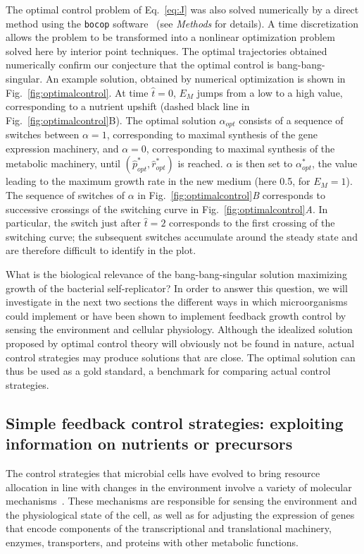 The optimal control problem of Eq.~\ref{eq:J} was also solved numerically by a direct method using the \texttt{bocop} software~\cite{bonnans_bocop_2012} (see \textit{Methods} for details).
A time discretization allows the problem to be transformed into a nonlinear optimization problem solved here by interior point techniques.
The optimal trajectories obtained numerically confirm our conjecture that the optimal control is bang-bang-singular.
An example solution, obtained by numerical optimization is shown in Fig.~\ref{fig:optimalcontrol}.
At time $\hat{t}=0$, $E_M$ jumps from a low to a high value, corresponding to a nutrient upshift (dashed black line in Fig.~\ref{fig:optimalcontrol}B).
The optimal solution $\alpha_{opt}$ consists of a sequence of switches between $\alpha=1$, corresponding to maximal synthesis of the gene expression machinery, and $\alpha=0$, corresponding to maximal synthesis of the metabolic machinery, until $(\hat{p}_{opt}^*,\hat{r}_{opt}^*)$ is reached.
$\alpha$ is then set to $\alpha^*_{opt}$, the value leading to the maximum growth rate in the new medium (here 0.5, for $E_M=1$).
The sequence of switches of $\alpha$ in Fig.~\ref{fig:optimalcontrol}\textit{B} corresponds to successive crossings of the switching curve in Fig.~\ref{fig:optimalcontrol}\textit{A}.
In particular, the switch just after $\hat{t}=2$ corresponds to the first crossing of the switching curve; the subsequent switches accumulate around the steady state and are therefore difficult to identify in the plot.

What is the biological relevance of the bang-bang-singular solution maximizing growth of the bacterial self-replicator?
In order to answer this question, we will investigate in the next two sections the different ways in which microorganisms could implement or have been shown to implement feedback growth control by sensing the environment and cellular physiology.
Although the idealized solution proposed by optimal control theory will obviously not be found in nature, actual control strategies may produce solutions that are close.
The optimal solution can thus be used as a gold standard, a benchmark for comparing actual control strategies. 

\subsection{Simple feedback control strategies: exploiting information on nutrients or precursors}
\label{sec:steadystate}

The control strategies that microbial cells have evolved to bring resource allocation in line with changes in the environment involve a variety of molecular mechanisms~\cite{chubukov_coordination_2014}.
These mechanisms are responsible for sensing the environment and the physiological state of the cell, as well as for adjusting the expression of genes that encode components of the transcriptional and translational machinery, enzymes, transporters, and proteins with other metabolic functions.


